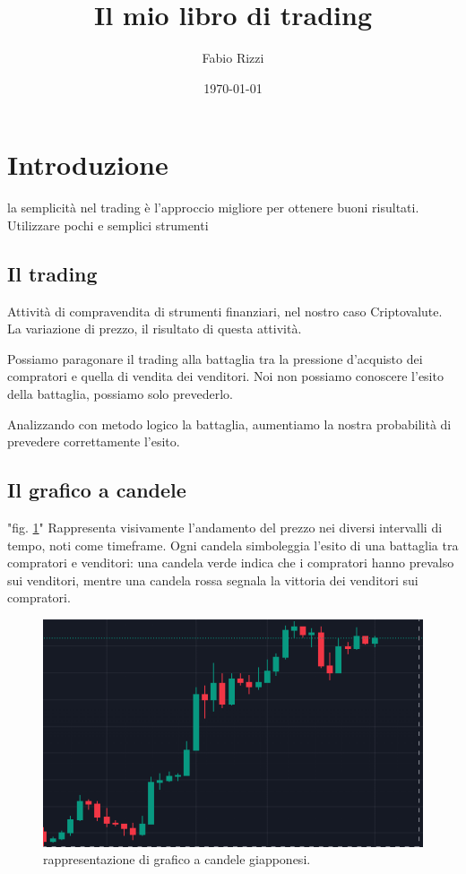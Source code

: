 \documentclass[12pt]{book}
\begin{document}
\title{Il mio libro di trading}
\author{Fabio Rizzi}
\date{\today}
\maketitle  %

\tableofcontents

\chapter*{Introduzione}
la semplicità nel trading è l'approccio migliore per ottenere buoni risultati.\\
Utilizzare pochi e semplici strumenti

\section*{Il trading} 
Attività di compravendita di strumenti finanziari, nel nostro caso Criptovalute. La variazione di prezzo, il risultato di questa attività.

Possiamo paragonare il trading alla battaglia tra la pressione d'acquisto dei compratori e quella di vendita dei venditori. Noi non possiamo conoscere l'esito della battaglia, possiamo solo prevederlo.

Analizzando con metodo logico la battaglia, aumentiamo la nostra probabilità di prevedere correttamente l'esito.
\section*{Il grafico a candele} "fig. \ref{graficocandele}" Rappresenta visivamente l'andamento del prezzo nei diversi intervalli di tempo, noti come timeframe. Ogni candela simboleggia l'esito di una battaglia tra compratori e venditori: una candela verde indica che i compratori hanno prevalso sui venditori, mentre una candela rossa segnala la vittoria dei venditori sui compratori.

\begin{figure}[h!]
    \centering
    \includegraphics[width=0.5\linewidth]{Immagini/grafico-candele.png} %
    \caption{rappresentazione di grafico a candele giapponesi.}
    \label{graficocandele} %
\end{figure}
\end{document}
